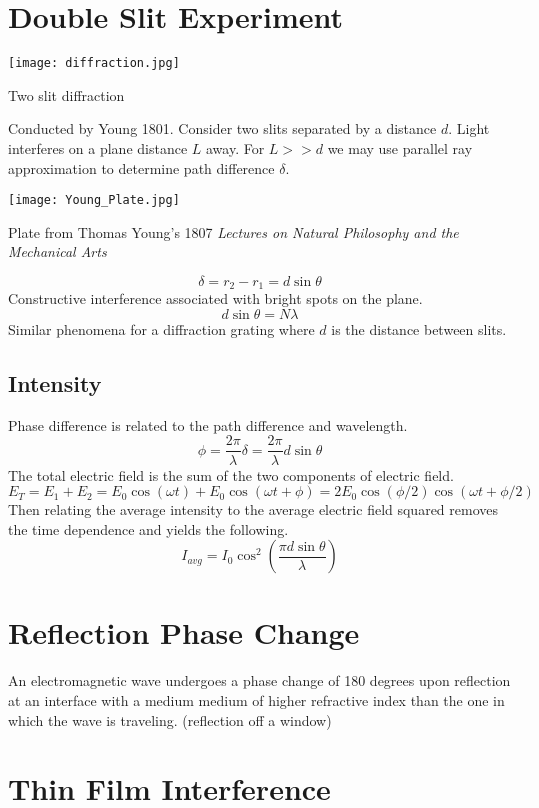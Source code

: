 \section{Double Slit Experiment}
\begin{marginfigure}[30pt]
  \texttt{[image: diffraction.jpg]}
  \caption{Two slit diffraction}
  \label{fig:marginfig}
\end{marginfigure}
Conducted by Young 1801.  Consider two slits separated by a distance $d$.  Light interferes on a plane distance $L$ away.  For $L>>d$ we may use parallel ray approximation to determine path difference $\delta$.  
\begin{marginfigure}[10pt]
  \texttt{[image: Young\_Plate.jpg]}
  \caption{Plate from Thomas Young's 1807 \textit{Lectures on Natural Philosophy and the Mechanical Arts}}
  \label{fig:marginfig}
\end{marginfigure}
$$\delta=r_2-r_1=d\sin\theta$$
Constructive interference associated with bright spots on the plane.
$$d\sin\theta=N\lambda$$
Similar phenomena for a diffraction grating where $d$ is the distance between slits.
 
 \subsection{Intensity}
 Phase difference is related to the path difference and wavelength.
 $$\phi=\frac{2\pi}{\lambda}\delta=\frac{2\pi}{\lambda}d\sin\theta$$
 The total electric field is the sum of the two components of electric field. 
 $$E_T=E_1+E_2=E_0\cos(\omega t)+E_0\cos(\omega t+\phi)=2E_0\cos(\phi/2)\cos(\omega t +\phi/2)$$
 Then relating the average intensity to the average electric field squared removes the time dependence and yields the following. 
 $$I_{avg}=I_0\cos^2\left(\frac{\pi d \sin \theta}{\lambda}\right)$$
 
  \vspace{1cm}
 
 \section{Reflection Phase Change}
 An electromagnetic wave undergoes a phase change of 180 degrees upon reflection at an interface with a medium medium of higher refractive index than the one in which the wave is traveling.  (reflection off a window)
 

 
 \section{Thin Film Interference}
 
